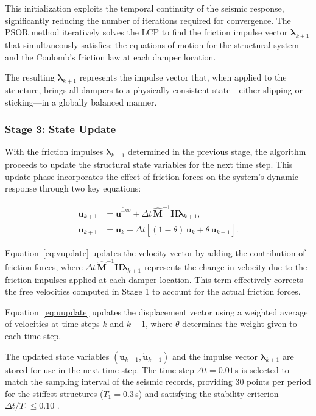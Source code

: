 \documentclass[preprint,12pt,authoryear]{elsarticle}
\begin{document}
This initialization exploits the temporal continuity of the seismic response, significantly reducing the number of iterations required for convergence. The PSOR method iteratively solves the LCP to find the friction impulse vector $\bm{\lambda}_{k+1}$ that simultaneously satisfies: the equations of motion for the structural system and the Coulomb's friction law at each damper location.

The resulting $\bm{\lambda}_{k+1}$ represents the impulse vector that, when applied to the structure, brings all dampers to a physically consistent state—either slipping or sticking—in a globally balanced manner.

\subsubsection*{Stage 3: State Update}
\label{sec:theory:state_update}

With the friction impulses \(\bm{\lambda}_{k+1}\) determined in the previous stage, the algorithm proceeds to update the structural state variables for the next time step. This update phase incorporates the effect of friction forces on the system's dynamic response through two key equations:

\begin{align}
	\dot{\bm{u}}_{k+1} &= \dot{\bm{u}}^{\mathrm{free}}
	+ \Delta t\,\hat{\bm{M}}^{-1}\bm{H}\bm{\lambda}_{k+1}, \label{eq:vupdate}\\
	\bm{u}_{k+1} &= \bm{u}_k
	+ \Delta t\!\left[(1-\theta)\,\dot{\bm{u}}_k
	+ \theta\,\dot{\bm{u}}_{k+1}\right]. \label{eq:uupdate}
\end{align}

Equation~\eqref{eq:vupdate} updates the velocity vector by adding the contribution of friction forces, where \(\Delta t\,\hat{\bm{M}}^{-1}\bm{H}\bm{\lambda}_{k+1}\) represents the change in velocity due to the friction impulses applied at each damper location. This term effectively corrects the free velocities computed in Stage 1 to account for the actual friction forces.

Equation~\eqref{eq:uupdate} updates the displacement vector using a weighted average of velocities at time steps \(k\) and \(k+1\), where \(\theta\) determines the weight given to each time step.

The updated state variables \((\bm{u}_{k+1},\dot{\bm{u}}_{k+1})\) and the impulse vector \(\bm{\lambda}_{k+1}\) are stored for use in the next time step. The time step \(\Delta t = 0.01\)\,s is selected to match the sampling interval of the seismic records, providing 30 points per period for the stiffest structures (\(T_1 = 0.3\)\,s) and satisfying the stability criterion \(\Delta t / T_1 \leq 0.10\) \citep{chopra_dynamics_2015}.
\end{document}
